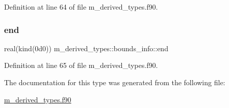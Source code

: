 Definition at line 64 of file m\+\_\+derived\+\_\+types.\+f90.

\mbox{\label{structm__derived__types_1_1bounds__info_af45e47c874ec834cddb38daa755c9cab}} 
\subsubsection{\texorpdfstring{end}{end}}
{\footnotesize\ttfamily real(kind(0d0)) m\+\_\+derived\+\_\+types\+::bounds\+\_\+info\+::end}



Definition at line 65 of file m\+\_\+derived\+\_\+types.\+f90.



The documentation for this type was generated from the following file\+:\begin{DoxyCompactItemize}
\item 
\hyperlink{m__derived__types_8f90}{m\+\_\+derived\+\_\+types.\+f90}\end{DoxyCompactItemize}
